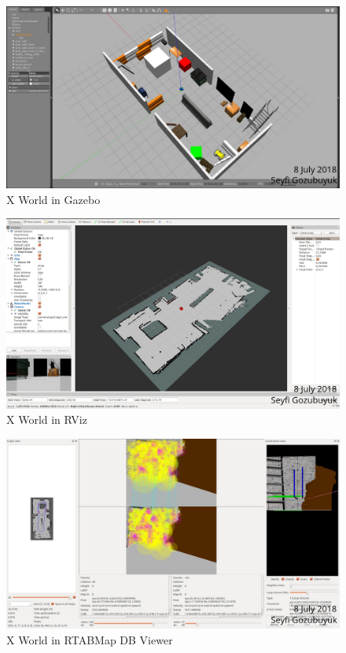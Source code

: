 \documentclass[10pt,journal,compsoc]{IEEEtran}
\begin{document}
\begin{figure}[thpb]
      \centering
      \includegraphics[width=\linewidth]{figures/gazebo_x.png}
      \caption{X World in Gazebo}
      \label{fig:gazx}
\end{figure}

\begin{figure}[thpb]
      \centering
      \includegraphics[width=\linewidth]{figures/rviz_x.png}
      \caption{X World in RViz}
      \label{fig:rvzx}
\end{figure}

\begin{figure}[thpb]
      \centering
      \includegraphics[width=\linewidth]{figures/rtabmap_x.png}
      \caption{X World in RTABMap DB Viewer}
      \label{fig:rtbx}
\end{figure}
\end{document}
